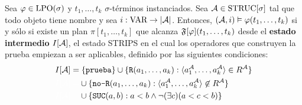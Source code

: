 \begin{theorem}
\label{teoremaprimerorden}
Sea $\varphi \in \text{LPO}(\sigma)$ y $t_1,\ldots,t_k$ $\sigma$-términos instanciados. Sea $\mathcal{A} \in
\text{STRUC}[\sigma]$ tal que todo objeto tiene nombre y sea $i : \text{VAR} \rightarrow |\mathcal{A}|$.
Entonces, $(\mathcal{A}, i) \vDash \varphi(t_1,\ldots,t_k)$ si y sólo si
existe un plan $\pi[t_1,\ldots,t_k]$ que alcanza
$\mathfrak{F}[\varphi](t_1,\ldots,t_k)$ desde el \textbf{estado intermedio} $I[\mathcal{A}]$,
el estado STRIPS en el cual los operadores que construyen la
prueba empiezan a ser aplicables, definido por las siguientes condiciones:
\begin{alignat*}{1}
& I[\A] = \{\texttt{prueba}\} \cup \{ \texttt{R}(a_1,\ldots,a_k) :
\tup{a_1^\A,\ldots,a_k^\A} \in R^\A\}\\
& {\color{white} I[\A] = } \cup \{\texttt{no-R}(a_1,\ldots,a_k) : \tup{a_1^\A,\ldots,a_k^\A} \not\in R^\A\}\\
& {\color{white} I[\A] = } \cup \{\texttt{SUC}(a, b): a < b \land \neg (\exists c) (a < c < b)\}
\end{alignat*}
\end{theorem}
